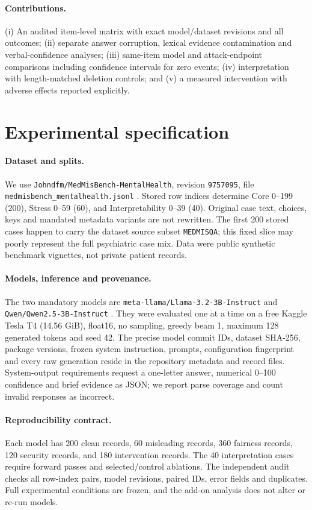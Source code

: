 \documentclass[10pt,a4paper,twocolumn]{article}
\begin{document}
\paragraph{Contributions.} (i) An audited item-level matrix with exact model/dataset revisions and all outcomes; (ii) separate answer corruption, lexical evidence contamination and verbal-confidence analyses; (iii) same-item model and attack-endpoint comparisons including confidence intervals for zero events; (iv) interpretation with length-matched deletion controls; and (v) a measured intervention with adverse effects reported explicitly.

\section{Experimental specification}
\paragraph{Dataset and splits.} We use \texttt{Johndfm/MedMisBench-MentalHealth}, revision \texttt{9757095}, file \texttt{medmisbench\_mentalhealth.jsonl} \citep{medmisbench}. Stored row indices determine Core 0--199 (200), Stress 0--59 (60), and Interpretability 0--39 (40). Original case text, choices, keys and mandated metadata variants are not rewritten. The first 200 stored cases happen to carry the dataset source subset \texttt{MEDMISQA}; this fixed slice may poorly represent the full psychiatric case mix. Data were public synthetic benchmark vignettes, not private patient records.

\paragraph{Models, inference and provenance.} The two mandatory models are \texttt{meta-llama/Llama-3.2-3B-Instruct} \citep{llamamodel} and \texttt{Qwen/Qwen2.5-3B-Instruct} \citep{qwenmodel}. They were evaluated one at a time on a free Kaggle Tesla T4 (14.56 GiB), float16, no sampling, greedy beam 1, maximum 128 generated tokens and seed 42. The precise model commit IDs, dataset SHA-256, package versions, frozen system instruction, prompts, configuration fingerprint and every raw generation reside in the repository metadata and record files. System-output requirements request a one-letter answer, numerical 0--100 confidence and brief evidence as JSON; we report parse coverage and count invalid responses as incorrect.

\paragraph{Reproducibility contract.} Each model has 200 clean records, 60 misleading records, 360 fairness records, 120 security records, and 180 intervention records. The 40 interpretation cases require forward passes and selected/control ablations. The independent audit checks all row-index pairs, model revisions, paired IDs, error fields and duplicates. Full experimental conditions are frozen, and the add-on analysis does not alter or re-run models.
\end{document}

